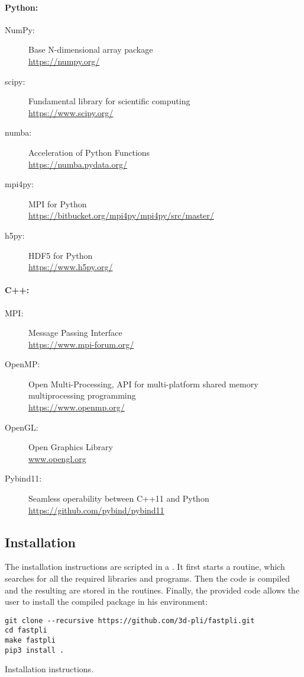 \paragraph{Python:}
\begin{description}
\item[NumPy:] Base N-dimensional array package \cite{2019arXiv190710121V}\\
\url{https://numpy.org/}
\item[scipy:] Fundamental library for scientific computing \cite{2019arXiv190710121V}\\
\url{https://www.scipy.org/}
\item[numba:] Acceleration of Python Functions \cite{Lam2015}\\
\url{https://numba.pydata.org/}
\item[mpi4py:] MPI for Python \cite{Dalcn2005, Dalcn2008, Dalcin2011}\\
\url{https://bitbucket.org/mpi4py/mpi4py/src/master/}
\item[h5py:] HDF5 for Python \cite{collette_python_hdf5_2014, hdf5}\\
\url{https://www.h5py.org/}
\end{description}
%
\newpage
\paragraph{C++:}
\begin{description}
\item[MPI:] Message Passing Interface \cite{message2015mpi}\\
\url{https://www.mpi-forum.org/}
\item[OpenMP:] Open Multi-Processing, API for multi-platform shared memory multiprocessing programming \cite{dagum1998openmp}\\
\url{https://www.openmp.org/}
\item[OpenGL:] Open Graphics Library \cite{khronos}\\
\url{www.opengl.org}
\item[Pybind11:] Seamless operability between C++11 and Python \cite{pybind11}\\ \url{https://github.com/pybind/pybind11}
\end{description}
%
%
%
\subsection{Installation}
%
The installation instructions are scripted in a .
It first starts a  routine, which searches for all the required libraries and programs.
Then the \cpp{} code is compiled and the resulting  are stored in the \python{} routines.
Finally, the provided code  allows the user to install the compiled package in his environment:
%
\begin{lstfloat}[!ht]
\lstset{style=common}
\begin{lstlisting}
git clone --recursive https://github.com/3d-pli/fastpli.git
cd fastpli
make fastpli
pip3 install .
\end{lstlisting}
\caption[]{Installation instructions.}
\end{lstfloat}
%
%
%
